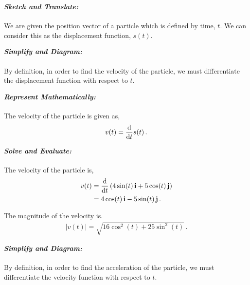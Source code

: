 \begin{subquestions}
\begin{subsubquestions}
\end{subsubquestions}	


\subquestion

\begin{subsubquestions}
	
\subsubquestion

\textbf{\textit{Sketch and Translate:}} \\ \\
We are given the position vector of a particle which is defined by time, $t$. We can consider this as the displacement function, $s(t)$.




\textbf{\textit{Simplify and Diagram:}} \\ \\
By definition, in order to find the velocity of the particle, we must differentiate the displacement function with respect to $t$.




\textbf{\textit{Represent Mathematically:}} \\ \\
The velocity of the particle is given as,
\begin{equation}
	v(t) = \frac{\mathrm{d}}{\mathrm{d}t} s(t) \,.
\end{equation}




\textbf{\textit{Solve and Evaluate:}} \\ \\
The velocity of the particle is,
\begin{align}
	v(t) & = \frac{\mathrm{d}}{\mathrm{d}t} \left(4\sin(t)\,\mathbf{i} + 5\cos(t)\,\mathbf{j} \right) \nonumber \\
	     & = 4\cos(t) \,\mathbf{i} -5\sin(t) \,\mathbf{j}\,.
\end{align}

The magnitude of the velocity is.
\begin{align}
	|v(t)| = \sqrt{16\cos^2(t)+25\sin^2(t)} \,. 
\end{align}
 

\subsubquestion

\textbf{\textit{Simplify and Diagram:}} \\ \\
By definition, in order to find the acceleration of the particle, we must differentiate the velocity function with respect to $t$.





\end{subsubquestions}
\end{subquestions}
